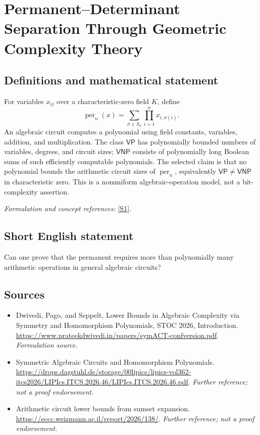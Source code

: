 \documentclass[11pt]{article}
\begin{document}
\section*{\texorpdfstring{Permanent–Determinant Separation Through Geometric Complexity Theory}{Permanent–Determinant Separation Through Geometric Complexity Theory}}\label{statement}
\subsection{Definitions and mathematical statement}
For variables $x_{ij}$ over a characteristic-zero field $K$, define
\[
 \operatorname{per}_n(x)=\sum_{\sigma\in S_n}\prod_{i=1}^n x_{i,\sigma(i)}.
\]
An algebraic circuit computes a polynomial using field constants, variables, addition, and multiplication. The class $\mathsf{VP}$ has polynomially bounded numbers of variables, degrees, and circuit sizes; $\mathsf{VNP}$ consists of polynomially long Boolean sums of such efficiently computable polynomials. The selected claim is that no polynomial bounds the arithmetic circuit sizes of $\operatorname{per}_n$, equivalently $\mathsf{VP}\ne\mathsf{VNP}$ in characteristic zero. This is a nonuniform algebraic-operation model, not a bit-complexity assertion.
\par\smallskip\textit{Formulation and concept references:} \href{https://www.prateekdwivedi.in/papers/symACT-confversion.pdf}{[S1]}.

\subsection{Short English statement}
Can one prove that the permanent requires more than polynomially many arithmetic operations in general algebraic circuits?
\subsection{Sources}
\begin{itemize}
\item[S1]Dwivedi, Pago, and Seppelt, Lower Bounds in Algebraic Complexity via Symmetry and Homomorphism Polynomials, STOC 2026, Introduction.
\url{https://www.prateekdwivedi.in/papers/symACT-confversion.pdf}.
\textit{Formulation source.}
\item[S2]Symmetric Algebraic Circuits and Homomorphism Polynomials.
\url{https://drops.dagstuhl.de/storage/00lipics/lipics-vol362-itcs2026/LIPIcs.ITCS.2026.46/LIPIcs.ITCS.2026.46.pdf}.
\textit{Further reference; not a proof endorsement.}
\item[S3]Arithmetic circuit lower bounds from sumset expansion.
\url{https://eccc.weizmann.ac.il/report/2026/138/}.
\textit{Further reference; not a proof endorsement.}
\end{itemize}
\end{document}
